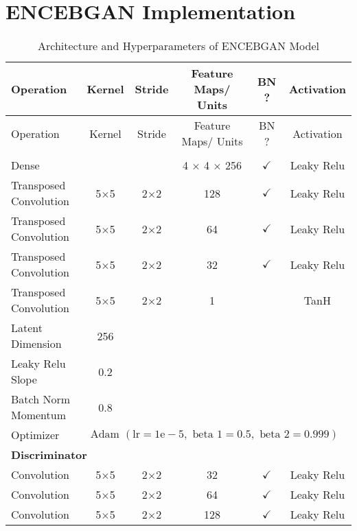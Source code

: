 \section{ENCEBGAN Implementation}
\label{app:encebgan}
\begin{longtable}[c]{@{}lccccc@{}}
	\caption{Architecture and Hyperparameters of ENCEBGAN Model}
	\label{tab:encebgan_imp}\\
	\toprule
	Operation & Kernel & Stride & Feature Maps/ Units & BN ? & Activation \\* \midrule
	\endfirsthead
	\toprule
	Operation & Kernel & Stride & Feature Maps/ Units & BN ? & Activation \\* \midrule
	\endhead
	\bottomrule
	\endfoot
	\endlastfoot
	\multicolumn{6}{l}{\textbf{Generator}} \\
	Dense & \multicolumn{1}{c}{} &  & 4 $\times$ 4 $\times$ 256 & $\checkmark$ & Leaky Relu \\
	Transposed Convolution & \multicolumn{1}{c}{5$\times$5} & 2$\times$2 & 128 & $\checkmark$ & Leaky Relu \\
	Transposed Convolution & \multicolumn{1}{c}{5$\times$5} & 2$\times$2 & 64 & $\checkmark$ & Leaky Relu \\
	Transposed Convolution & \multicolumn{1}{c}{5$\times$5} & 2$\times$2 & 32 & $\checkmark$ & Leaky Relu \\
	Transposed Convolution & \multicolumn{1}{c}{5$\times$5} & 2$\times$2 & 1 &  & TanH\\
	Latent Dimension & 256 & \multicolumn{1}{l}{} & \multicolumn{1}{l}{} & \multicolumn{1}{l}{} & \multicolumn{1}{l}{} \\
	Leaky Relu Slope & 0.2 & \multicolumn{1}{l}{} & \multicolumn{1}{l}{} & \multicolumn{1}{l}{} & \multicolumn{1}{l}{} \\
	Batch Norm Momentum & 0.8 & \multicolumn{1}{l}{} & \multicolumn{1}{l}{} & \multicolumn{1}{l}{} & \multicolumn{1}{l}{} \\
	Optimizer & \multicolumn{5}{l}{$\text { Adam }(\mathrm{lr}=1 \mathrm{e}-5, \text { beta } 1=0.5, \text { beta } 2=0.999)$} \\ \hline
	\multicolumn{6}{l}{\textbf{Discriminator}} \\
	Convolution & \multicolumn{1}{c}{5$\times$5} & 2$\times$2 & 32 & $\checkmark$ & Leaky Relu \\
	Convolution & \multicolumn{1}{c}{5$\times$5} & 2$\times$2 & 64 & $\checkmark$ & Leaky Relu \\
	Convolution & \multicolumn{1}{c}{5$\times$5} & 2$\times$2 & 128 & $\checkmark$ & Leaky Relu \\

\end{longtable}
